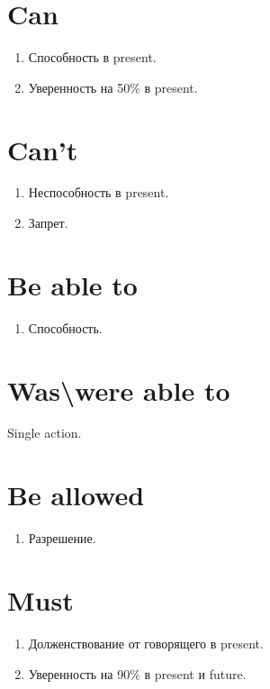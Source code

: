 \documentclass[oneside]{book}
\begin{document}
    \section{Can}
    \begin{enumerate}
        \item Способность в present.
        \item Уверенность на 50\% в present.
    \end{enumerate}

    \section{Can't}
    \begin{enumerate}
        \item Неспособность в present.
        \item Запрет.
    \end{enumerate}

    \section{Be able to}
    \begin{enumerate}
        \item Способность.
    \end{enumerate}

    \section{Was\textbackslash were able to}
    Single action.

    \section{Be allowed}
    \begin{enumerate}
        \item Разрешение.
    \end{enumerate}

    \section{Must}
    \begin{enumerate}
        \item Долженствование от говорящего в present.
        \item Уверенность на 90\% в present и future.
    \end{enumerate}
\end{document}
